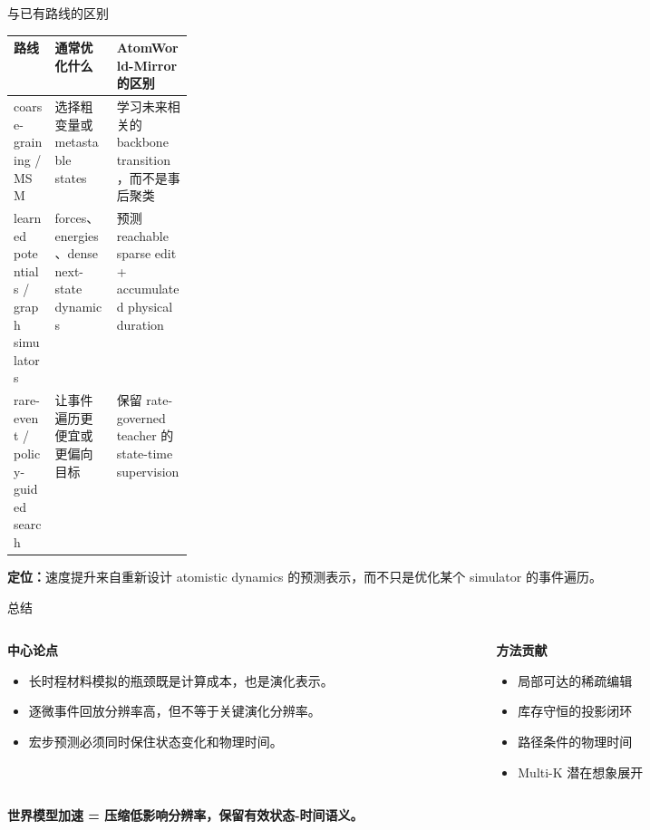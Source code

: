 \documentclass[aspectratio=43,10pt]{beamer}
\newcommand{\hl}[1]{\textcolor{thuPurple}{\textbf{#1}}}
\newcommand{\tightitems}{\setlength{\itemsep}{0.35em}}
\begin{document}
\begin{frame}{与已有路线的区别}
  \small
  \begin{tabularx}{\linewidth}{@{}p{0.23\linewidth}X X@{}}
    \toprule
    \textbf{路线} & \textbf{通常优化什么} & \textbf{AtomWorld-Mirror 的区别} \\
    \midrule
    coarse-graining / MSM &
    选择粗变量或 metastable states &
    学习未来相关的 backbone transition，而不是事后聚类 \\
    learned potentials / graph simulators &
    forces、energies、dense next-state dynamics &
    预测 reachable sparse edit + accumulated physical duration \\
    rare-event / policy-guided search &
    让事件遍历更便宜或更偏向目标 &
    保留 rate-governed teacher 的 state-time supervision \\
    \bottomrule
  \end{tabularx}
  \vspace{0.6cm}

  \normalsize
  \hl{定位：}速度提升来自重新设计 atomistic dynamics 的预测表示，而不只是优化某个 simulator 的事件遍历。
\end{frame}

\begin{frame}{总结}
  \begin{columns}[T,onlytextwidth]
    \begin{column}{0.50\textwidth}
      \textbf{中心论点}
      \begin{itemize}
        \tightitems
        \item 长时程材料模拟的瓶颈既是计算成本，也是演化表示。
        \item 逐微事件回放分辨率高，但不等于关键演化分辨率。
        \item 宏步预测必须同时保住状态变化和物理时间。
      \end{itemize}
    \end{column}
    \begin{column}{0.46\textwidth}
      \textbf{方法贡献}
      \begin{itemize}
        \tightitems
        \item 局部可达的稀疏编辑
        \item 库存守恒的投影闭环
        \item 路径条件的物理时间
        \item Multi-K 潜在想象展开
      \end{itemize}
    \end{column}
  \end{columns}
  \vspace{0.7cm}
  \begin{center}
    \large \hl{世界模型加速 = 压缩低影响分辨率，保留有效状态-时间语义。}
  \end{center}
\end{frame}
\end{document}
